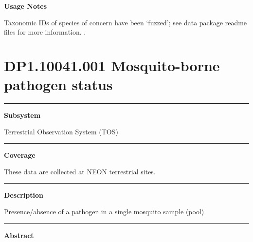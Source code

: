 \documentclass[]{article}
\begin{document}
\textbf{Usage Notes}

Taxonomic IDs of species of concern have been `fuzzed'; see data package
readme files for more information. \newpage
.

\section{DP1.10041.001 Mosquito-borne pathogen
status}\label{dp1.10041.001-mosquito-borne-pathogen-status}

\begin{center}\rule{0.5\linewidth}{\linethickness}\end{center}

\textbf{Subsystem}

Terrestrial Observation System (TOS)

\begin{center}\rule{0.5\linewidth}{\linethickness}\end{center}

\textbf{Coverage}

These data are collected at NEON terrestrial sites.

\begin{center}\rule{0.5\linewidth}{\linethickness}\end{center}

\textbf{Description}

Presence/absence of a pathogen in a single mosquito sample (pool)

\begin{center}\rule{0.5\linewidth}{\linethickness}\end{center}

\textbf{Abstract}
\end{document}
